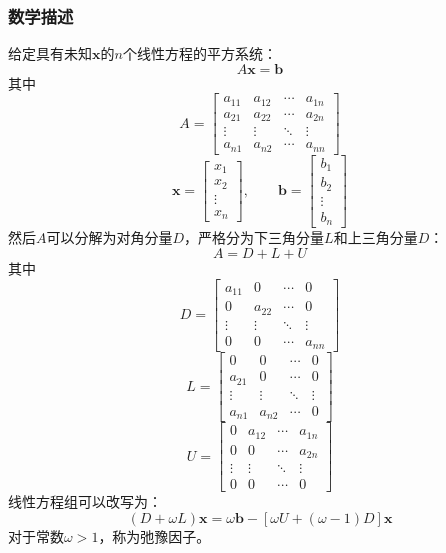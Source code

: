 \documentclass[twoside,twocolumn]{article}
\begin{document}
\begin{CJK*}{UTF8}{gkai}
	\subsubsection{数学描述}
	给定具有未知$\mathbf{x}$的$n$个线性方程的平方系统：
	\begin{equation*}
	A\mathbf{x}=\mathbf{b}
	\end{equation*}
	其中
	\begin{equation*}
	A={\begin{bmatrix}a_{11}&a_{12}&\cdots &a_{1n}\\a_{21}&a_{22}&\cdots &a_{2n}\\\vdots &\vdots &\ddots &\vdots \\a_{n1}&a_{n2}&\cdots &a_{nn}\end{bmatrix}}
	\end{equation*}
	\begin{equation*}
	\mathbf {x} ={\begin{bmatrix}x_{1}\\x_{2}\\\vdots \\x_{n}\end{bmatrix}},\qquad \mathbf {b} ={\begin{bmatrix}b_{1}\\b_{2}\\\vdots \\b_{n}\end{bmatrix}}
	\end{equation*}
	然后$A$可以分解为对角分量$D$，严格分为下三角分量$L$和上三角分量$D$：
	\begin{equation*}
	A=D+L+U
	\end{equation*}
	其中
	\begin{equation*}
	D={\begin{bmatrix}a_{11}&0&\cdots &0\\0&a_{22}&\cdots &0\\\vdots &\vdots &\ddots &\vdots \\0&0&\cdots &a_{nn}\end{bmatrix}}
	\end{equation*}
	\begin{equation*}
	 L={\begin{bmatrix}0&0&\cdots &0\\a_{21}&0&\cdots &0\\\vdots &\vdots &\ddots &\vdots \\a_{n1}&a_{n2}&\cdots &0\end{bmatrix}}
	\end{equation*}
	\begin{equation*}
	U={\begin{bmatrix}0&a_{12}&\cdots &a_{1n}\\0&0&\cdots &a_{2n}\\\vdots &\vdots &\ddots &\vdots \\0&0&\cdots &0\end{bmatrix}}
	\end{equation*}
	线性方程组可以改写为：
	\begin{equation*}
	(D+\omega L)\mathbf {x} =\omega \mathbf {b} -[\omega U+(\omega -1)D]\mathbf {x}
	\end{equation*}
	对于常数$\omega>1$，称为弛豫因子。
	

\end{CJK*}
\end{document}
